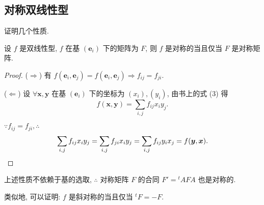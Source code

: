 \documentclass[color=black,device=normal,lang=cn,mode=geye]{elegantnote}
\begin{document}
\subsection{对称双线性型}
证明几个性质.
\begin{property}\label{p3.1}
    设 $f$ 是双线性型, $f$ 在基 $(\boldsymbol{e}_i)$ 下的矩阵为 $F$, 则 $f$ 是对称的当且仅当 $F$ 是对称矩阵.
\end{property}
\begin{proof}
    ($\Rightarrow$) 有 $f(\boldsymbol{e}_i,\boldsymbol{e}_j)=f(\boldsymbol{e}_i,\boldsymbol{e}_j)\Rightarrow f_{ij}=f_{ji}$.

    ($\Leftarrow$) 设 $\forall\boldsymbol{x},\boldsymbol{y}$ 在基 $(\boldsymbol{e}_i)$ 下的坐标为 $(x_i),(y_i)$, 由书上的式 (3) 得
    \[f(\boldsymbol{x},\boldsymbol{y})=\sum\limits_{i,j}f_{ij}x_iy_j.\]

    $\because f_{ij}=f_{ji},\therefore$
    \[\sum\limits_{i,j}f_{ij}x_iy_j=\sum\limits_{i,j}f_{ji}x_iy_j=\sum\limits_{i,j}f_{ij}y_ix_j=f(\boldsymbol{y},\boldsymbol{x}).\qedhere\]
\end{proof}
上述性质不依赖于基的选取, $\therefore$ 对称矩阵 $F$ 的合同 $F'={}^tAFA$ 也是对称的.

类似地, 可以证明: $f$ 是斜对称的当且仅当 $^tF=-F$.
\end{document}
